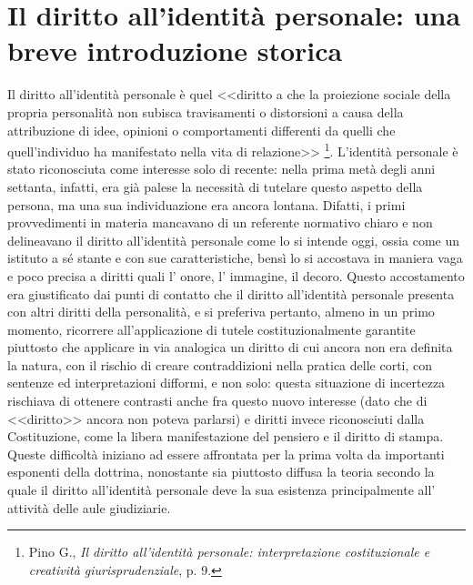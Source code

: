 
\section{Il diritto all'identità personale: una breve introduzione storica}
Il diritto all'identità personale è quel <<diritto a che la proiezione sociale della propria personalità non subisca travisamenti
o distorsioni a causa della attribuzione di idee, opinioni o comportamenti differenti da quelli che quell’individuo ha manifestato nella vita di relazione>>
\footnote{Pino G.,\textit{ Il diritto all'identità personale: interpretazione costituzionale e creatività giurisprudenziale}, p. 9.}.
L'identità personale è stato riconosciuta come interesse solo di recente: nella prima metà degli anni settanta, infatti, era già palese la necessità di tutelare questo aspetto della persona, ma una sua individuazione era ancora lontana. Difatti, i primi provvedimenti in materia mancavano di un referente normativo chiaro e non delineavano il diritto all’identità personale come lo si intende oggi, ossia come un istituto a sé stante e con sue caratteristiche, bensì lo si accostava in maniera vaga e poco precisa a diritti quali l' onore, l' immagine, il decoro.
Questo accostamento era giustificato dai punti di contatto che il diritto all'identità personale presenta con altri diritti della personalità, e si preferiva pertanto, almeno in un primo momento, ricorrere all'applicazione di tutele costituzionalmente garantite piuttosto che applicare in via analogica un diritto di cui ancora non era definita la natura, con il rischio di creare contraddizioni nella pratica delle corti, con sentenze ed interpretazioni difformi, e non solo: questa situazione di incertezza rischiava di ottenere contrasti anche fra questo nuovo interesse (dato che di <<diritto>> ancora non poteva parlarsi) e diritti invece riconosciuti dalla Costituzione, come la libera manifestazione del pensiero e il diritto di stampa. 
Queste difficoltà iniziano ad essere affrontata per la prima volta da importanti esponenti della dottrina, nonostante sia piuttosto diffusa la teoria secondo la quale il diritto all'identità personale deve la sua esistenza principalmente all' attività delle aule giudiziarie. 
